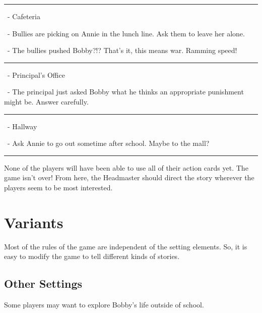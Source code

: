 \documentclass[a4paper, 10pt,notumble]{leaflet}
\DeclareRobustCommand\spades[1][black]{\textcolor{#1}{\cardfont{\}}}}
\DeclareRobustCommand\hearts[1][red]{\textcolor{#1}{{\cardfont{\{}}}}
\DeclareRobustCommand\diamonds[1][red]{\textcolor{#1}{{\cardfont{[}}}}
\DeclareRobustCommand\clubs[1][black]{\textcolor{#1}{\cardfont{]}}}
\DeclareRobustCommand\six[1][black]{\textcolor{#1}{\cardfont{6}}}
\DeclareRobustCommand\seven[1][black]{\textcolor{#1}{\cardfont{7}}}
\DeclareRobustCommand\redfive[1][red]{\textcolor{#1}{\cardfont{5}}}
\DeclareRobustCommand\redsix[1][red]{\textcolor{#1}{\cardfont{6}}}
\DeclareRobustCommand\redseven[1][red]{\textcolor{#1}{\cardfont{7}}}
\DeclareRobustCommand\redeight[1][red]{\textcolor{#1}{\cardfont{8}}}
\DeclareRobustCommand\redten[1][red]{\textcolor{#1}{\cardfont{=}}}
\begin{document}
\begin{description}[topsep=0pt, labelindent=0pt, leftmargin=0.0cm]
	\rule{\textwidth}{1pt}

	
	\item[Location 4\normalfont{:}] \redfive\diamonds\ - Cafeteria
	\smallskip
	\begin{description}[labelindent = 0.5cm, leftmargin=0.75cm]
		\item[Challenge 4a\normalfont{:}] \redeight\hearts\ - Bullies are picking on Annie in the lunch line. Ask them to leave her alone.
		\item[Challenge 4b\normalfont{:}] \six\clubs\ - The bullies pushed Bobby?!? That's it, this means war. Ramming speed! 
	\end{description}
	
	\rule{\textwidth}{1pt}
	
	\item[Location 5\normalfont{:}] \redsix\diamonds\ - Principal's Office
	\smallskip
	\begin{description}[labelindent = 0.5cm, leftmargin=0.75cm]
		\item[Challenge 5a\normalfont{:}] \seven\spades\ - The principal just asked Bobby what he thinks an appropriate punishment might be. Answer carefully.
	\end{description}
	
	\rule{\textwidth}{1pt}
	
	\item[Location 6\normalfont{:}] \redseven\diamonds\ - Hallway
	\smallskip
	\begin{description}[labelindent = 0.5cm, leftmargin=0.75cm]
		\item[Challenge 6a\normalfont{:}] \redten\hearts\ - Ask Annie to go out sometime after school. Maybe to the mall?
	\end{description}
	
	\rule{\textwidth}{1pt}

\end{description}
\medskip
None of the players will have been able to use all of their action cards yet. The game isn't over! From here, the Headmaster should direct the story wherever the players seem to be most interested.

\newpage
\section{Variants}
Most of the rules of the game are independent of the setting elements. So, it is easy to modify the game to tell different kinds of stories.

\subsection{Other Settings}
Some players may want to explore Bobby's life outside of school. 
\end{document}
